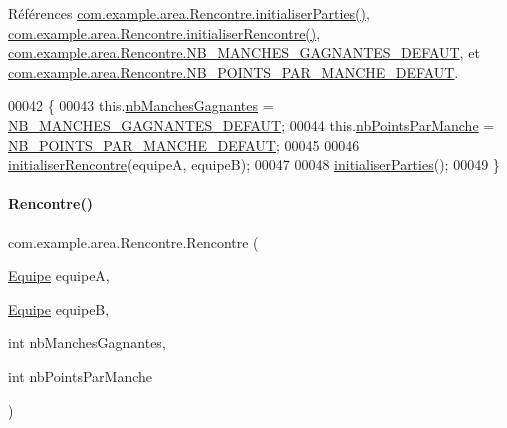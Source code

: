 Références \hyperlink{_rencontre_8java_source_l00081}{com.\+example.\+area.\+Rencontre.\+initialiser\+Parties()}, \hyperlink{_rencontre_8java_source_l00071}{com.\+example.\+area.\+Rencontre.\+initialiser\+Rencontre()}, \hyperlink{_rencontre_8java_source_l00033}{com.\+example.\+area.\+Rencontre.\+N\+B\+\_\+\+M\+A\+N\+C\+H\+E\+S\+\_\+\+G\+A\+G\+N\+A\+N\+T\+E\+S\+\_\+\+D\+E\+F\+A\+UT}, et \hyperlink{_rencontre_8java_source_l00034}{com.\+example.\+area.\+Rencontre.\+N\+B\+\_\+\+P\+O\+I\+N\+T\+S\+\_\+\+P\+A\+R\+\_\+\+M\+A\+N\+C\+H\+E\+\_\+\+D\+E\+F\+A\+UT}.


\begin{DoxyCode}
00042     \{
00043         this.\hyperlink{classcom_1_1example_1_1area_1_1_rencontre_aef266bd256aecd70fbd02cf07625ed14}{nbManchesGagnantes} = \hyperlink{classcom_1_1example_1_1area_1_1_rencontre_a9ab6dcd72bcb2ca3c21ed3fcba4a9b46}{NB\_MANCHES\_GAGNANTES\_DEFAUT};
00044         this.\hyperlink{classcom_1_1example_1_1area_1_1_rencontre_ae1849c4bcdcfbb2d336b750a36be1162}{nbPointsParManche} = \hyperlink{classcom_1_1example_1_1area_1_1_rencontre_ac2217d1cf2cf9310966619ba69214259}{NB\_POINTS\_PAR\_MANCHE\_DEFAUT};
00045 
00046         \hyperlink{classcom_1_1example_1_1area_1_1_rencontre_a61ff55a4fb128654aec0456d5b3adaa3}{initialiserRencontre}(equipeA, equipeB);
00047 
00048         \hyperlink{classcom_1_1example_1_1area_1_1_rencontre_a9af98788b76483567c06eac9a02418c5}{initialiserParties}();
00049     \}
\end{DoxyCode}
\mbox{\label{classcom_1_1example_1_1area_1_1_rencontre_a28c1f3173d0d0a81abb80fac81a184d4}} 
\paragraph{\texorpdfstring{Rencontre()}{Rencontre()}\hspace{0.1cm}{\footnotesize\ttfamily [2/2]}}
{\footnotesize\ttfamily com.\+example.\+area.\+Rencontre.\+Rencontre (\begin{DoxyParamCaption}\item[{\hyperlink{classcom_1_1example_1_1area_1_1_equipe}{Equipe}}]{equipeA,  }\item[{\hyperlink{classcom_1_1example_1_1area_1_1_equipe}{Equipe}}]{equipeB,  }\item[{int}]{nb\+Manches\+Gagnantes,  }\item[{int}]{nb\+Points\+Par\+Manche }\end{DoxyParamCaption})}



